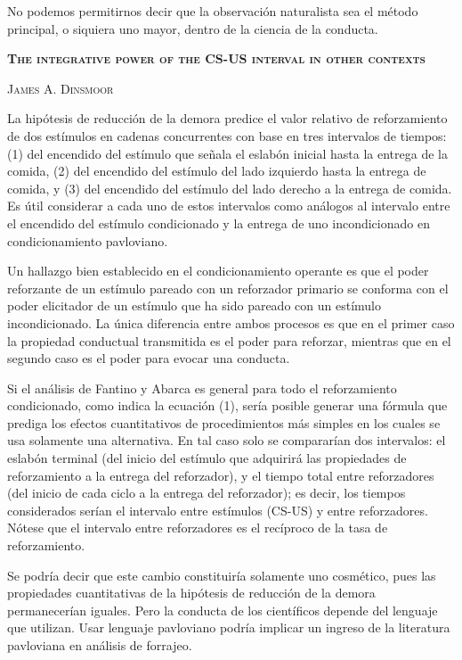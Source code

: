 \documentclass[a4paper,12pt]{article}
\begin{document}
No podemos permitirnos decir que la observación naturalista sea el método principal, o siquiera uno mayor, dentro de la ciencia de la conducta.

{\scshape\bfseries The integrative power of the CS-US interval in other contexts}

{\scshape James A. Dinsmoor}

La hipótesis de reducción de la demora predice el valor relativo de reforzamiento de dos estímulos en cadenas concurrentes con base en tres intervalos de tiempos: (1) del encendido del estímulo que señala el eslabón inicial hasta la entrega de la comida, (2) del encendido del estímulo del lado izquierdo hasta la entrega de comida, y (3) del encendido del estímulo del lado derecho a la entrega de comida. Es útil considerar a cada uno de estos intervalos como análogos al intervalo entre el encendido del estímulo condicionado y la entrega de uno incondicionado en condicionamiento pavloviano. 

Un hallazgo bien establecido en el condicionamiento operante es que el poder reforzante de un estímulo pareado con un reforzador primario se conforma con el poder elicitador de un estímulo que ha sido pareado con un estímulo incondicionado. La única diferencia entre ambos procesos es que en el primer caso la propiedad conductual transmitida es el poder para reforzar, mientras que en el segundo caso es el poder para evocar una conducta.

Si el análisis de Fantino y Abarca es general para todo el reforzamiento condicionado, como indica la ecuación (1), sería posible generar una fórmula que prediga los efectos cuantitativos de procedimientos más simples en los cuales se usa solamente una alternativa. En tal caso solo se compararían dos intervalos: el eslabón terminal (del inicio del estímulo que adquirirá las propiedades de reforzamiento a la entrega del reforzador), y el tiempo total entre reforzadores (del inicio de cada ciclo a la entrega del reforzador); es decir, los tiempos considerados serían el intervalo entre estímulos (CS-US) y entre reforzadores. Nótese que el intervalo entre reforzadores es el recíproco de la tasa de reforzamiento.

Se podría decir que este cambio constituiría solamente uno cosmético, pues las propiedades cuantitativas de la hipótesis de reducción de la demora permanecerían iguales. Pero la conducta de los científicos depende del lenguaje que utilizan. Usar lenguaje pavloviano podría implicar un ingreso de la literatura pavloviana en análisis de forrajeo.
\end{document}
